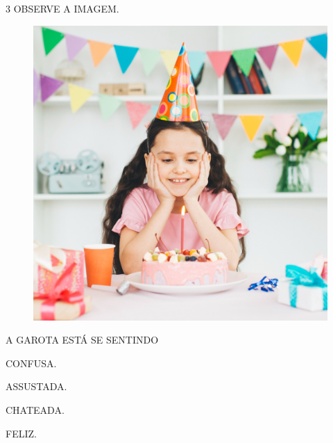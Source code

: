 \pagebreak
\num{3} OBSERVE A IMAGEM.

\begin{figure}[H]
\centering
\includegraphics[width=\textwidth]{media/image175c.jpg}
\end{figure}

A GAROTA ESTÁ SE SENTINDO

\begin{escolha}
\item CONFUSA.

\item ASSUSTADA.

\item CHATEADA.

\item FELIZ.
\end{escolha}

